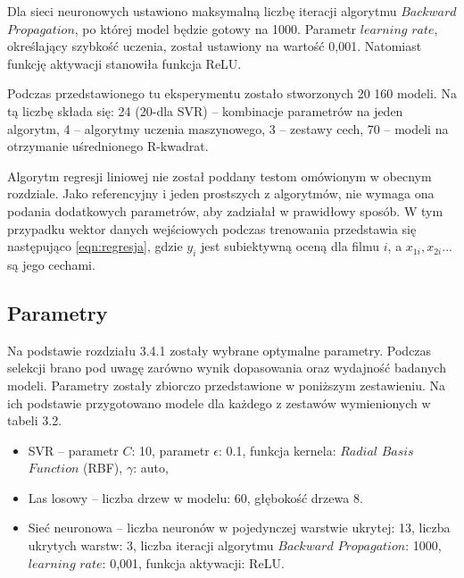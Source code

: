 Dla sieci neuronowych ustawiono maksymalną liczbę iteracji algorytmu $Backward$ $Propagation$, po której model będzie gotowy na 1000. Parametr $learning$ $rate$, określający szybkość uczenia, został ustawiony na wartość 0,001. Natomiast funkcję aktywacji stanowiła funkcja ReLU.\par

\vspace{5mm}

Podczas przedstawionego tu eksperymentu zostało stworzonych 20 160 modeli. Na tą liczbę składa się: 24 (20-dla SVR) -- kombinacje parametrów na jeden algorytm, 4 -- algorytmy uczenia maszynowego, 3 -- zestawy cech, 70 -- modeli na otrzymanie uśrednionego R-kwadrat.    

\vspace{5mm}

Algorytm regresji liniowej nie został poddany testom omówionym w obecnym rozdziale. Jako referencyjny i jeden prostszych z algorytmów, nie wymaga ona podania dodatkowych parametrów, aby zadziałał w prawidłowy sposób. W tym przypadku wektor danych wejściowych podczas trenowania przedstawia się  następująco \ref{eqn:regresja}, gdzie $y_i$ jest subiektywną oceną dla filmu $i$, a $x_{1i}, x_{2i}...$ są jego cechami. 

\vspace{7mm}

\subsection{Parametry}


Na podstawie rozdziału 3.4.1 zostały wybrane optymalne parametry. Podczas selekcji brano pod uwagę zarówno wynik dopasowania oraz wydajność badanych modeli. Parametry zostały zbiorczo przedstawione w poniższym zestawieniu. Na ich podstawie przygotowano modele dla każdego z zestawów wymienionych w tabeli 3.2.


\begin{itemize}[label=$\bullet$]
	\item SVR --  parametr $C$: 10, parametr $\epsilon$: 0.1, funkcja kernela:  $Radial$ $Basis$ $Function$ (RBF), $\gamma$: auto, 
	
	\item Las losowy -- liczba drzew w modelu: 60, głębokość drzewa 8. 

	\item Sieć neuronowa -- liczba neuronów w pojedynczej warstwie ukrytej: 13, liczba ukrytych warstw: 3, liczba iteracji algorytmu $Backward$ $Propagation$: 1000, $learning$ $rate$: 0,001, funkcja aktywacji: ReLU.\par 
	
\end{itemize}

